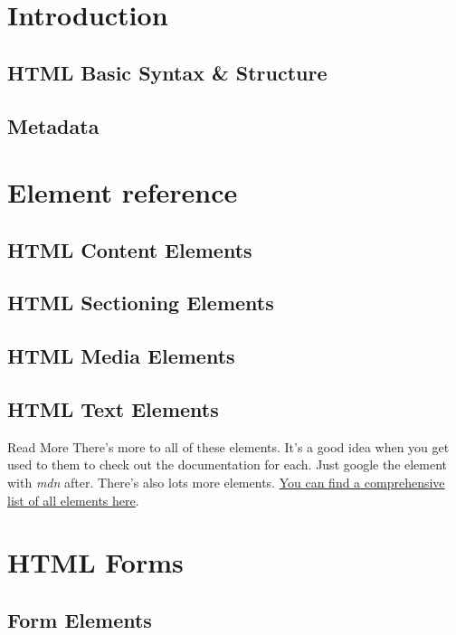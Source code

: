\documentclass[b5paper,openany]{book}
\begin{document}
\tp


\tableofcontents



\chapter{Introduction}

\section{HTML Basic Syntax \& Structure}


\section{Metadata}



\chapter{Element reference}

\section{HTML Content Elements}


\section{HTML Sectioning Elements}


\section{HTML Media Elements}


\section{HTML Text Elements}
%

\begin{infobox}{Read More}
    There's more to all of these elements. It's a good idea when you get used to them to check out the documentation for each. Just google the element with \textit{mdn} after.
		There's also lots more elements. \href{https://developer.mozilla.org/en-US/docs/Web/HTML/Element}{You can find a comprehensive list of all elements here}.
\end{infobox}




\chapter{HTML Forms}

\section{Form Elements}
%




\end{document}
